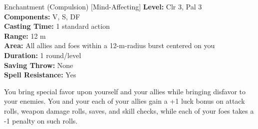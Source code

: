 {Enchantment (Compulsion) [Mind-Affecting]}
{
	\textbf{Level:}
	Clr 3, Pal 3\\
	\textbf{Components:}
	V, S, DF\\
	\textbf{Casting Time:}
	1 standard action\\
	\textbf{Range:}
	12 m\\
	\textbf{Area:}
	All allies and foes within a 12-m-radius burst centered on you\\
	\textbf{Duration:}
	1 round/level\\
	\textbf{Saving Throw:}
	None\\
	\textbf{Spell Resistance:}
	Yes\\
}
{
	You bring special favor upon yourself and your allies while bringing disfavor to your enemies. You and your each of your allies gain a +1 luck bonus on attack rolls, weapon damage rolls, saves, and skill checks, while each of your foes takes a -1 penalty on such rolls.

}
